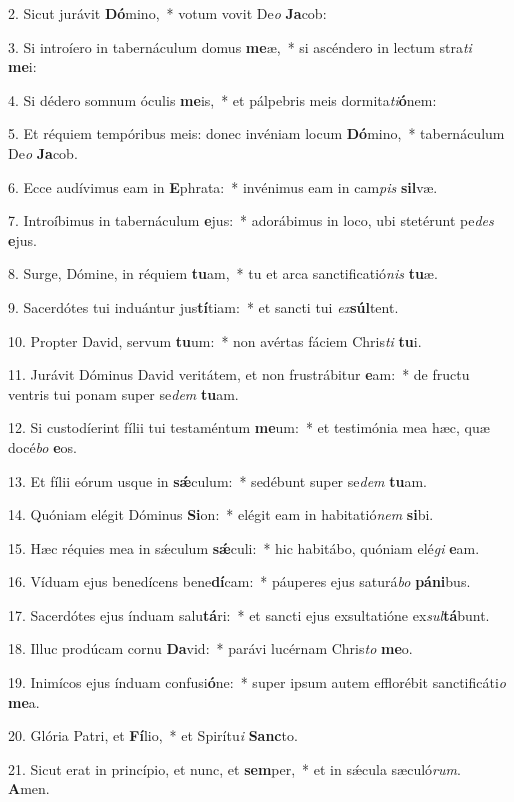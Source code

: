 2. Sicut jurávit \textbf{Dó}mino,~*  votum vovit De\textit{o} \textbf{Ja}cob:\

3. Si introíero in tabernáculum domus \textbf{me}æ,~*  si ascéndero in lectum stra\textit{ti} \textbf{me}i:\

4. Si dédero somnum óculis \textbf{me}is,~*  et pálpebris meis dormita\textit{ti}\textbf{ó}nem:\

5. Et réquiem tempóribus meis: donec invéniam locum \textbf{Dó}mino,~*  tabernáculum De\textit{o} \textbf{Ja}cob.\

6. Ecce audívimus eam in \textbf{E}phrata:~*  invénimus eam in cam\textit{pis} \textbf{sil}væ.\

7. Introíbimus in tabernáculum \textbf{e}jus:~*  adorábimus in loco, ubi stetérunt pe\textit{des} \textbf{e}jus.\

8. Surge, Dómine, in réquiem \textbf{tu}am,~*  tu et arca sanctificatió\textit{nis} \textbf{tu}æ.\

9. Sacerdótes tui induántur jus\textbf{tí}tiam:~*  et sancti tui \textit{ex}\textbf{súl}tent.\

10. Propter David, servum \textbf{tu}um:~*  non avértas fáciem Chris\textit{ti} \textbf{tu}i.\

11. Jurávit Dóminus David veritátem, et non frustrábitur \textbf{e}am:~*  de fructu ventris tui ponam super se\textit{dem} \textbf{tu}am.\

12. Si custodíerint fílii tui testaméntum \textbf{me}um:~*  et testimónia mea hæc, quæ docé\textit{bo} \textbf{e}os.\

13. Et fílii eórum usque in \textbf{sǽ}culum:~*  sedébunt super se\textit{dem} \textbf{tu}am.\

14. Quóniam elégit Dóminus \textbf{Si}on:~*  elégit eam in habitatió\textit{nem} \textbf{si}bi.\

15. Hæc réquies mea in sǽculum \textbf{sǽ}culi:~*  hic habitábo, quóniam elé\textit{gi} \textbf{e}am.\

16. Víduam ejus benedícens bene\textbf{dí}cam:~*  páuperes ejus saturá\textit{bo} \textbf{pá}\textbf{ni}bus.\

17. Sacerdótes ejus índuam salu\textbf{tá}ri:~*  et sancti ejus exsultatióne ex\textit{sul}\textbf{tá}bunt.\

18. Illuc prodúcam cornu \textbf{Da}vid:~*  parávi lucérnam Chris\textit{to} \textbf{me}o.\

19. Inimícos ejus índuam confusi\textbf{ó}ne:~*  super ipsum autem efflorébit sanctificáti\textit{o} \textbf{me}a.\

20. Glória Patri, et \textbf{Fí}lio,~*  et Spirítu\textit{i} \textbf{Sanc}to.\

21. Sicut erat in princípio, et nunc, et \textbf{sem}per,~*  et in sǽcula sæculó\textit{rum}. \textbf{A}men.\

